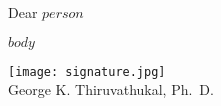 \documentclass[11pt,english]{luclet}
\date{\vspace*{0.8in}\today}
\begin{document}


\signature{
   \texttt{[image: signature.jpg]}\\
   George K. Thiruvathukal, Ph.\ D.}

\opening{Dear $person$}

$body$

\texttt{[image: signature.jpg]}\\
George K. Thiruvathukal, Ph.\ D.
\end{document}
